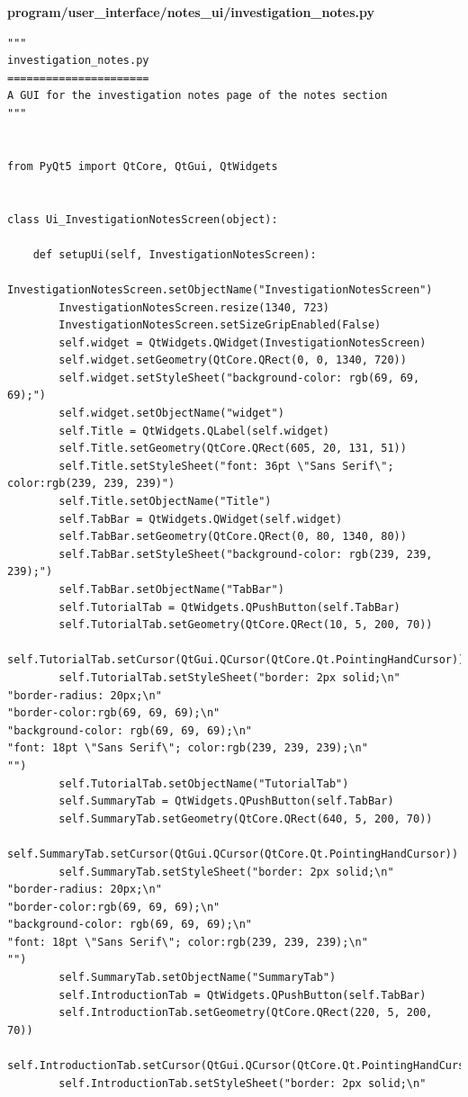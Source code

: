 \documentclass{article}
\begin{document}
\textbf{program/user\_interface/notes\_ui/investigation\_notes.py}
\begin{lstlisting}
"""
investigation_notes.py
======================
A GUI for the investigation notes page of the notes section
"""


from PyQt5 import QtCore, QtGui, QtWidgets


class Ui_InvestigationNotesScreen(object):

    def setupUi(self, InvestigationNotesScreen):
        InvestigationNotesScreen.setObjectName("InvestigationNotesScreen")
        InvestigationNotesScreen.resize(1340, 723)
        InvestigationNotesScreen.setSizeGripEnabled(False)
        self.widget = QtWidgets.QWidget(InvestigationNotesScreen)
        self.widget.setGeometry(QtCore.QRect(0, 0, 1340, 720))
        self.widget.setStyleSheet("background-color: rgb(69, 69, 69);")
        self.widget.setObjectName("widget")
        self.Title = QtWidgets.QLabel(self.widget)
        self.Title.setGeometry(QtCore.QRect(605, 20, 131, 51))
        self.Title.setStyleSheet("font: 36pt \"Sans Serif\"; color:rgb(239, 239, 239)")
        self.Title.setObjectName("Title")
        self.TabBar = QtWidgets.QWidget(self.widget)
        self.TabBar.setGeometry(QtCore.QRect(0, 80, 1340, 80))
        self.TabBar.setStyleSheet("background-color: rgb(239, 239, 239);")
        self.TabBar.setObjectName("TabBar")
        self.TutorialTab = QtWidgets.QPushButton(self.TabBar)
        self.TutorialTab.setGeometry(QtCore.QRect(10, 5, 200, 70))
        self.TutorialTab.setCursor(QtGui.QCursor(QtCore.Qt.PointingHandCursor))
        self.TutorialTab.setStyleSheet("border: 2px solid;\n"
"border-radius: 20px;\n"
"border-color:rgb(69, 69, 69);\n"
"background-color: rgb(69, 69, 69);\n"
"font: 18pt \"Sans Serif\"; color:rgb(239, 239, 239);\n"
"")
        self.TutorialTab.setObjectName("TutorialTab")
        self.SummaryTab = QtWidgets.QPushButton(self.TabBar)
        self.SummaryTab.setGeometry(QtCore.QRect(640, 5, 200, 70))
        self.SummaryTab.setCursor(QtGui.QCursor(QtCore.Qt.PointingHandCursor))
        self.SummaryTab.setStyleSheet("border: 2px solid;\n"
"border-radius: 20px;\n"
"border-color:rgb(69, 69, 69);\n"
"background-color: rgb(69, 69, 69);\n"
"font: 18pt \"Sans Serif\"; color:rgb(239, 239, 239);\n"
"")
        self.SummaryTab.setObjectName("SummaryTab")
        self.IntroductionTab = QtWidgets.QPushButton(self.TabBar)
        self.IntroductionTab.setGeometry(QtCore.QRect(220, 5, 200, 70))
        self.IntroductionTab.setCursor(QtGui.QCursor(QtCore.Qt.PointingHandCursor))
        self.IntroductionTab.setStyleSheet("border: 2px solid;\n"

\end{lstlisting}
\end{document}
